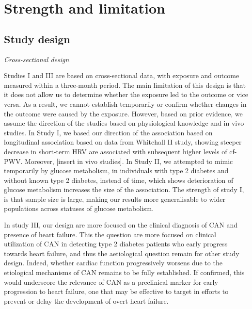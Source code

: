 \documentclass[
  a4paper,
  headsepline=true,
  open=any]{scrbook}
\begin{document}

\hypertarget{strength-and-limitation}{%
\chapter{Strength and limitation}\label{strength-and-limitation}}

\hypertarget{study-design}{%
\section{Study design}\label{study-design}}

\emph{Cross-sectional design}

Studies I and III are based on cross-sectional data, with exposure and
outcome measured within a three-month period. The main limitation of
this design is that it does not allow us to determine whether the
exposure led to the outcome or vice versa. As a result, we cannot
establish temporarily or confirm whether changes in the outcome were
caused by the exposure. However, based on prior evidence, we assume the
direction of the studies based on physiological knowledge and in vivo
studies. In Study I, we based our direction of the association based on
longitudinal association based on data from Whitehall II study, showing
steeper decrease in short-term HRV are associated with subsequent higher
levels of cf-PWV. Moreover, {[}insert in vivo studies{]}. In Study II,
we attempted to mimic temporarily by glucose metabolism, in individuals
with type 2 diabetes and without known type 2 diabetes, instead of time,
which shows deterioration of glucose metabolism increases the size of
the association. The strength of study I, is that sample size is large,
making our results more generalisable to wider populations across
statuses of glucose metabolism.

In study III, our design are more focused on the clinical diagnosis of
CAN and presence of heart failure. This the question are more focused on
clinical utilization of CAN in detecting type 2 diabetes patients who
early progress towards heart failure, and thus the aetiological question
remain for other study design. Indeed, whether cardiac function
progressively worsens due to the etiological mechanisms of CAN remains
to be fully established. If confirmed, this would underscore the
relevance of CAN as a preclinical marker for early progression to heart
failure, one that may be effective to target in efforts to prevent or
delay the development of overt heart failure.
\end{document}
